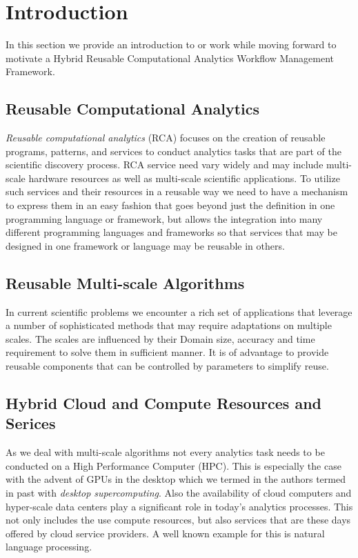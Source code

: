 
\section{Introduction}

In this section we provide an introduction to or work while 
moving forward to motivate a 
Hybrid Reusable Computational Analytics Workflow
Management Framework.

\subsection{Reusable Computational Analytics}

{\em Reusable computational analytics} (RCA) focuses on  the creation of reusable programs, patterns, and services to conduct analytics tasks that are part of the scientific discovery process.  RCA service need vary widely and may include multi-scale hardware resources as well as multi-scale scientific applications. To utilize such services and their resources in a reusable way we need to have a mechanism to express them in an easy fashion that goes beyond just the definition in one programming language or framework, but allows the integration into many different programming languages and frameworks so that services that may be designed in one framework or language may be reusable in others.

\subsection{Reusable Multi-scale Algorithms}

In current scientific problems we encounter a rich set of applications that leverage a number of sophisticated methods that may require adaptations on multiple scales. The scales are influenced by their Domain size, accuracy and time requirement to solve them in sufficient manner. It is of advantage to provide reusable components that can be controlled by parameters to simplify reuse.

\subsection{Hybrid Cloud and Compute Resources and Serices}

As we deal with multi-scale algorithms not every analytics task needs to be conducted on a High Performance Computer (HPC). This is especially the case with the advent of GPUs in the desktop which we termed in the authors termed in past with {\em desktop supercomputing}. Also the availability of cloud computers and hyper-scale data centers play a significant role in today's analytics processes. This not only includes the use compute resources, but also services that are these days offered by cloud service providers. A well known example for this is natural language processing.

